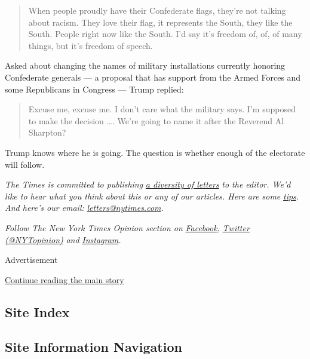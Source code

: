 \begin{quote}
When people proudly have their Confederate flags, they're not talking
about racism. They love their flag, it represents the South, they like
the South. People right now like the South. I'd say it's freedom of, of,
of many things, but it's freedom of speech.
\end{quote}

Asked about changing the names of military installations currently
honoring Confederate generals --- a proposal that has support from the
Armed Forces and some Republicans in Congress --- Trump replied:

\begin{quote}
Excuse me, excuse me. I don't care what the military says. I'm supposed
to make the decision \ldots{}. We're going to name it after the Reverend
Al Sharpton?
\end{quote}

Trump knows where he is going. The question is whether enough of the
electorate will follow.

\emph{The Times is committed to publishing}
\href{https://www.nytimes.com/2019/01/31/opinion/letters/letters-to-editor-new-york-times-women.html}{\emph{a
diversity of letters}} \emph{to the editor. We'd like to hear what you
think about this or any of our articles. Here are some}
\href{https://help.nytimes.com/hc/en-us/articles/115014925288-How-to-submit-a-letter-to-the-editor}{\emph{tips}}\emph{.
And here's our email:}
\href{mailto:letters@nytimes.com}{\emph{letters@nytimes.com}}\emph{.}

\emph{Follow The New York Times Opinion section on}
\href{https://www.facebook.com/nytopinion}{\emph{Facebook}}\emph{,}
\href{http://twitter.com/NYTOpinion}{\emph{Twitter (@NYTopinion)}}
\emph{and}
\href{https://www.instagram.com/nytopinion/}{\emph{Instagram}}\emph{.}

Advertisement

\protect\hyperlink{after-bottom}{Continue reading the main story}

\hypertarget{site-index}{%
\subsection{Site Index}\label{site-index}}

\hypertarget{site-information-navigation}{%
\subsection{Site Information
Navigation}\label{site-information-navigation}}

